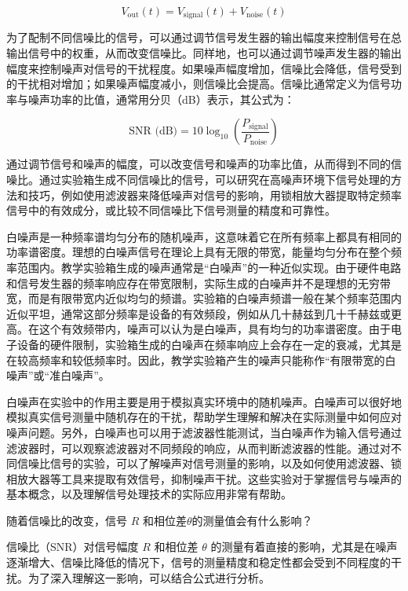 \[
V_{\text{out}}(t) = V_{\text{signal}}(t) + V_{\text{noise}}(t)
\]

为了配制不同信噪比的信号，可以通过调节信号发生器的输出幅度来控制信号在总输出信号中的权重，从而改变信噪比。同样地，也可以通过调节噪声发生器的输出幅度来控制噪声对信号的干扰程度。如果噪声幅度增加，信噪比会降低，信号受到的干扰相对增加；如果噪声幅度减小，则信噪比会提高。信噪比通常定义为信号功率与噪声功率的比值，通常用分贝（dB）表示，其公式为：

\[
\text{SNR (dB)} = 10 \log_{10}\left(\frac{P_{\text{signal}}}{P_{\text{noise}}}\right)
\]

通过调节信号和噪声的幅度，可以改变信号和噪声的功率比值，从而得到不同的信噪比。通过实验箱生成不同信噪比的信号，可以研究在高噪声环境下信号处理的方法和技巧，例如使用滤波器来降低噪声对信号的影响，用锁相放大器提取特定频率信号中的有效成分，或比较不同信噪比下信号测量的精度和可靠性。

白噪声是一种频率谱均匀分布的随机噪声，这意味着它在所有频率上都具有相同的功率谱密度。理想的白噪声信号在理论上具有无限的带宽，能量均匀分布在整个频率范围内。教学实验箱生成的噪声通常是“白噪声”的一种近似实现。由于硬件电路和信号发生器的频率响应存在带宽限制，实际生成的白噪声并不是理想的无穷带宽，而是有限带宽内近似均匀的频谱。实验箱的白噪声频谱一般在某个频率范围内近似平坦，通常这部分频率是设备的有效频段，例如从几十赫兹到几十千赫兹或更高。在这个有效频带内，噪声可以认为是白噪声，具有均匀的功率谱密度。由于电子设备的硬件限制，实验箱生成的白噪声在频率响应上会存在一定的衰减，尤其是在较高频率和较低频率时。因此，教学实验箱产生的噪声只能称作“有限带宽的白噪声”或“准白噪声”。

白噪声在实验中的作用主要是用于模拟真实环境中的随机噪声。白噪声可以很好地模拟真实信号测量中随机存在的干扰，帮助学生理解和解决在实际测量中如何应对噪声问题。另外，白噪声也可以用于滤波器性能测试，当白噪声作为输入信号通过滤波器时，可以观察滤波器对不同频段的响应，从而判断滤波器的性能。通过对不同信噪比信号的实验，可以了解噪声对信号测量的影响，以及如何使用滤波器、锁相放大器等工具来提取有效信号，抑制噪声干扰。这些实验对于掌握信号与噪声的基本概念，以及理解信号处理技术的实际应用非常有帮助。

\begin{question}
	随着信噪比的改变，信号 $R$ 和相位差$\theta$的测量值会有什么影响？
\end{question}
信噪比（SNR）对信号幅度 \( R \) 和相位差 \( \theta \) 的测量有着直接的影响，尤其是在噪声逐渐增大、信噪比降低的情况下，信号的测量精度和稳定性都会受到不同程度的干扰。为了深入理解这一影响，可以结合公式进行分析。


